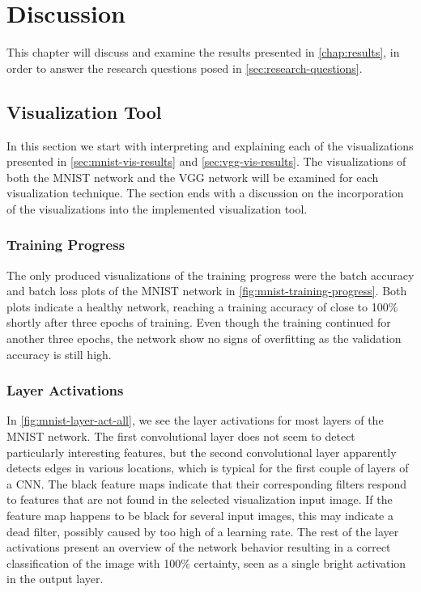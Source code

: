 
\chapter{Discussion} \label{chap:discussion}

This chapter will discuss and examine the results presented in \autoref{chap:results}, in order to answer the research questions posed in \autoref{sec:research-questions}.

\section{Visualization Tool}

In this section we start with interpreting and explaining each of the visualizations presented in \autoref{sec:mnist-vis-results} and \autoref{sec:vgg-vis-results}. The visualizations of both the MNIST network and the VGG network will be examined for each visualization technique. The section ends with a discussion on the incorporation of the visualizations into the implemented visualization tool.


\subsection{Training Progress}

The only produced visualizations of the training progress were the batch accuracy and batch loss plots of the MNIST network in \autoref{fig:mnist-training-progress}. Both plots indicate a healthy network, reaching a training accuracy of close to 100\% shortly after three epochs of training. Even though the training continued for another three epochs, the network show no signs of overfitting as the validation accuracy is still high.

\subsection{Layer Activations}

In \autoref{fig:mnist-layer-act-all}, we see the layer activations for most layers of the MNIST network. The first convolutional layer does not seem to detect particularly interesting features, but the second convolutional layer apparently detects edges in various locations, which is typical for the first couple of layers of a CNN. The black feature maps indicate that their corresponding filters respond to features that are not found in the selected visualization input image. If the feature map happens to be black for several input images, this may indicate a dead filter, possibly caused by too high of a learning rate. The rest of the layer activations present an overview of the network behavior resulting in a correct classification of the image with 100\% certainty, seen as a single bright activation in the output layer. \\


